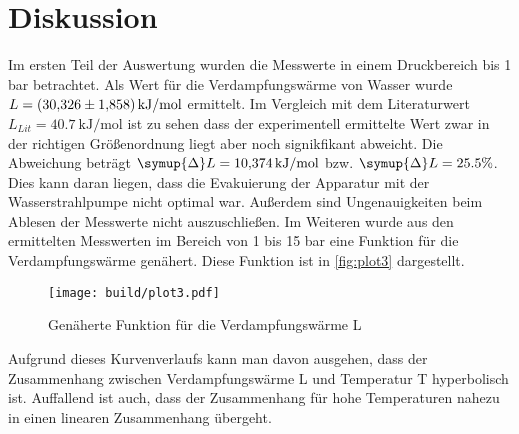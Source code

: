 \section{Diskussion}
\label{sec:Diskussion}
Im ersten Teil der Auswertung wurden die Messwerte in einem Druckbereich bis 1 bar betrachtet. Als Wert für die Verdampfungswärme von Wasser wurde $L=\SI{30.326 \pm 1.858 }{\kilo\joule\per\mol}$  ermittelt. Im Vergleich mit dem Literaturwert $L_{Lit}=\SI{40.7}{\kilo\joule\per\mol}$\cite{verdampf} ist zu sehen dass der experimentell ermittelte Wert zwar in der richtigen Größenordnung liegt aber noch signikfikant abweicht. Die Abweichung beträgt $\symup{\Delta}L=\SI{10.374}{\kilo\joule\per\mol}$ bzw. $\symup{\Delta}L=25.5\%$. Dies kann daran liegen, dass die Evakuierung der Apparatur mit der Wasserstrahlpumpe nicht optimal war. Außerdem sind Ungenauigkeiten beim Ablesen der Messwerte nicht auszuschließen. \newline
Im Weiteren wurde aus den ermittelten Messwerten im Bereich von 1 bis 15 bar eine Funktion für die Verdampfungswärme genähert. Diese Funktion ist in \autoref{fig:plot3} dargestellt.
\begin{figure}[H]
    \centering
    \texttt{[image: build/plot3.pdf]}
    \caption{Genäherte Funktion für die Verdampfungswärme L}
    \label{fig:plot3}
\end{figure}
\noindent
Aufgrund dieses Kurvenverlaufs kann man davon ausgehen, dass der Zusammenhang zwischen Verdampfungswärme L und Temperatur T hyperbolisch ist. Auffallend ist auch, dass der Zusammenhang für hohe Temperaturen nahezu in einen linearen Zusammenhang übergeht.